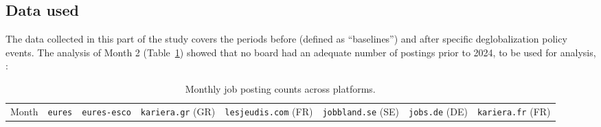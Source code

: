 \documentclass[
  letterpaper,
  DIV=11,
  numbers=noendperiod,
  sfdefaults=false]{scrartcl}
\begin{document}
\subsection{Data used}\label{data-used}

The data collected in this part of the study covers the periods before
(defined as ``baselines'') and after specific deglobalization policy
events. The analysis of Month 2 (Table~\ref{tbl-job-postings}) showed
that no board had an adequate number of postings prior to 2024, to be
used for analysis, :

\begin{longtable}[]{@{}
  >{\raggedright\arraybackslash}p{}
  >{\raggedleft\arraybackslash}p{}
  >{\raggedleft\arraybackslash}p{}
  >{\raggedleft\arraybackslash}p{}
  >{\raggedleft\arraybackslash}p{}
  >{\raggedleft\arraybackslash}p{}
  >{\raggedleft\arraybackslash}p{}
  >{\raggedleft\arraybackslash}p{}@{}}
\caption{Monthly job posting counts across
platforms.}\label{tbl-job-postings}\tabularnewline
\toprule\noalign{}
\begin{minipage}[b]{\linewidth}\raggedright
Month
\end{minipage} & \begin{minipage}[b]{\linewidth}\raggedleft
\texttt{eures}
\end{minipage} & \begin{minipage}[b]{\linewidth}\raggedleft
\texttt{eures-esco}
\end{minipage} & \begin{minipage}[b]{\linewidth}\raggedleft
\texttt{kariera.gr} (GR)
\end{minipage} & \begin{minipage}[b]{\linewidth}\raggedleft
\texttt{lesjeudis.com} (FR)
\end{minipage} & \begin{minipage}[b]{\linewidth}\raggedleft
\texttt{jobbland.se} (SE)
\end{minipage} & \begin{minipage}[b]{\linewidth}\raggedleft
\texttt{jobs.de} (DE)
\end{minipage} & \begin{minipage}[b]{\linewidth}\raggedleft
\texttt{kariera.fr} (FR)

\end{minipage}
\end{longtable}
\end{document}
